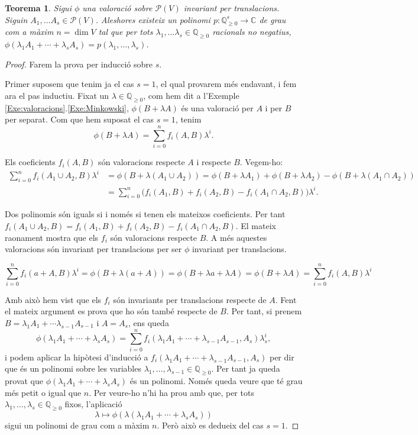 \documentclass{article}
\newtheorem{teorema}{Teorema}
\theoremstyle{definition}
\begin{document}
\begin{teorema}\label{Teo:valoraciopolinomial}
Sigui $\phi$ una valoraci\'{o} sobre $\mathcal{P}(V)$ invariant per translacions. Siguin $A_1,\ldots A_s\in\mathcal{P}(V)$. Aleshores existeix un polinomi $p:\mathbb{Q}_{\geq0}^s\rightarrow\mathbb{C}$ de grau com a m\`{a}xim $n=\dim V$ tal que per tots $\lambda_1,\ldots\lambda_s\in\mathbb{Q}_{\geq0}$ racionals no negatius, $\phi(\lambda_1A_1+\cdots+\lambda_sA_s)=p(\lambda_1,\ldots,\lambda_s)$.
\end{teorema}
\begin{proof}
Farem la prova per inducci\'{o} sobre $s$.

Primer suposem que tenim ja el cas $s=1$, el qual provarem m\'{e}s endavant, i fem ara el pas inductiu. Fixat un $\lambda\in\mathbb{Q}_{\geq0}$, com hem dit a l'Exemple \ref{Exe:valoracions}.\ref{Exe:Minkowski}, $\phi(B+\lambda A)$ \'{e}s una valoraci\'{o} per $A$ i per $B$ per separat. Com que hem suposat el cas $s=1$, tenim 
\[\phi(B+\lambda A)=\sum_{i=0}^nf_i(A,B)\lambda^i.\]

Els coeficients $f_i(A,B)$ s\'{o}n valoracions respecte $A$ i respecte $B$. Vegem-ho:
\begin{align*}
\sum_{i=0}^nf_i(A_1\cup A_2,B)\lambda^i&=\phi(B+\lambda(A_1\cup A_2))=\phi(B+\lambda A_1)+\phi(B+\lambda A_2)-\phi(B+\lambda(A_1\cap A_2))\\
&=\sum_{i=0}^n\big(f_i(A_1,B)+f_i(A_2,B)-f_i(A_1\cap A_2,B)\big)\lambda^i.
\end{align*}

Dos polinomis s\'{o}n iguals si i nom\'{e}s si tenen els mateixos coeficients. Per tant $f_i(A_1\cup A_2,B)=f_i(A_1,B)+f_i(A_2,B)-f_i(A_1\cap A_2,B)$. El mateix raonament mostra que els $f_i$ s\'{o}n valoracions respecte $B$. A m\'{e}s aquestes valoracions s\'{o}n invariant per translacions per ser $\phi$ invariant per translacions.

\[\sum_{i=0}^nf_i(a+A,B)\lambda^i=\phi(B+\lambda(a+A))=\phi(B+\lambda a+\lambda A)=\phi(B+\lambda A)=\sum_{i=0}^nf_i(A,B)\lambda^i\]

Amb aix\`{o} hem vist que els $f_i$ s\'{o}n invariants per translacions respecte de $A$. Fent el mateix argument es prova que ho s\'{o}n tamb\'{e} respecte de $B$. Per tant, si prenem $B=\lambda_1A_1+\cdots\lambda_{s-1}A_{s-1}$ i $A=A_s$, ens queda
\[\phi(\lambda_1A_1+\cdots+\lambda_sA_s)=\sum_{i=0}^nf_i(\lambda_1A_1+\cdots+\lambda_{s-1}A_{s-1},A_s)\lambda_s^i,\]
i podem aplicar la hip\`{o}tesi d'inducci\'{o} a $f_i(\lambda_1A_1+\cdots+\lambda_{s-1}A_{s-1},A_s)$ per dir que \'{e}s un polinomi sobre les variables $\lambda_1,\ldots,\lambda_{s-1}\in\mathbb{Q}_{\geq0}$. Per tant ja queda provat que $\phi(\lambda_1A_1+\cdots+\lambda_sA_s)$ \'{e}s un polinomi. Nom\'{e}s queda veure que t\'{e} grau m\'{e}s petit o igual que $n$. Per veure-ho n'hi ha prou amb que, per tots $\lambda_1,\ldots,\lambda_s\in\mathbb{Q}_{\geq0}$ fixos, l'aplicaci\'{o}
\[\lambda\longmapsto\phi(\lambda(\lambda_1A_1+\cdots+\lambda_sA_s))\]
sigui un polinomi de grau com a m\`{a}xim $n$. Per\`{o} aix\`{o} es dedueix del cas $s=1$.
\vspace{3mm}


\end{proof}
\end{document}
